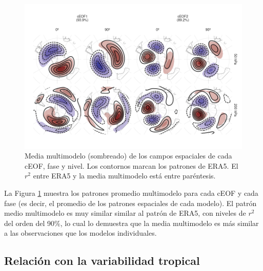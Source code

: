 \documentclass[12pt,oneside,a4paper]{reedthesis}
\begin{document}
\begin{figure}

{\centering \includegraphics{figures/50-cmip6/mmm-1} 

}

\caption{Media multimodelo (sombreado) de los campos espaciales de cada cEOF, fase y nivel. Los contornos marcan los patrones de ERA5. El \(r^2\) entre ERA5 y la media multimodelo está entre paréntesis.}\label{fig:mmm}
\end{figure}



La Figura \ref{fig:mmm} muestra los patrones promedio multimodelo para cada cEOF y cada fase (es decir, el promedio de los patrones espaciales de cada modelo).
El patrón medio multimodelo es muy similar similar al patrón de ERA5, con niveles de \(r^2\) del orden del 90\%, lo cual lo demuestra que la media multimodelo es más similar a las observaciones que los modelos individuales.

\hypertarget{relaciuxf3n-con-la-variabilidad-tropical}{%
\subsection{Relación con la variabilidad tropical}\label{relaciuxf3n-con-la-variabilidad-tropical}}
\end{document}
